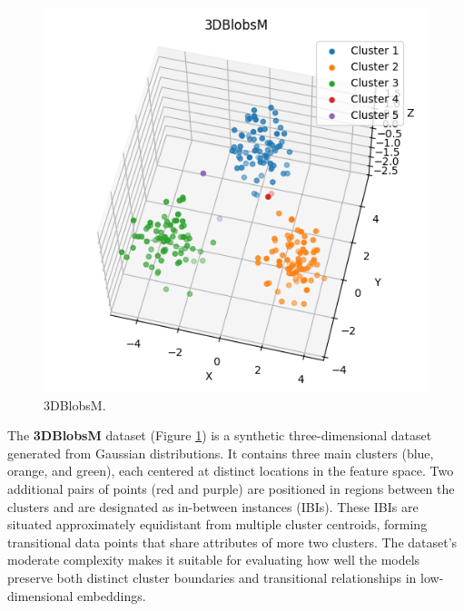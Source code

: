 \begin{figure}
    \centering
    \includegraphics[width=\myimgwidth]{images/datasets/3DBlobsM.png}
    \caption{3DBlobsM.}
    \label{fig:3DBlobsM}
\end{figure}
The \textbf{3DBlobsM} dataset (Figure \ref{fig:3DBlobsM}) is a synthetic three-dimensional dataset generated from Gaussian distributions. It contains three main clusters (blue, orange, and green), each centered at distinct locations in the feature space. Two additional pairs of points (red and purple) are positioned in regions between the clusters and are designated as in-between instances (IBIs). These IBIs are situated approximately equidistant from multiple cluster centroids, forming transitional data points that share attributes of more two clusters. The dataset’s moderate complexity makes it suitable for evaluating how well the models preserve both distinct cluster boundaries and transitional relationships in low-dimensional embeddings.
\newline


